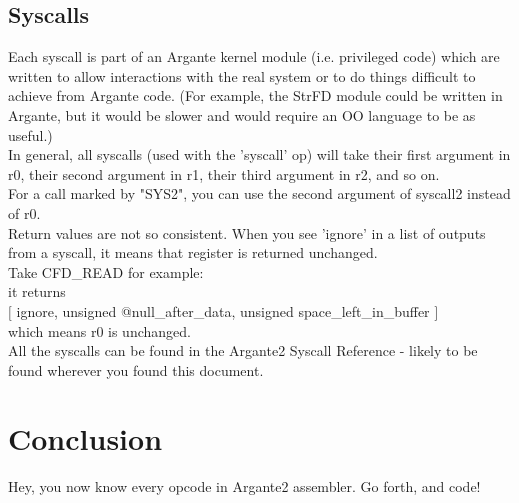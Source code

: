 \documentclass[a4paper,oneside,openany]{book}
\begin{document}
\subsection{Syscalls}
Each syscall is part of an Argante kernel module (i.e. privileged code) which are
written to allow interactions with the real system or to do things difficult to
achieve from Argante code. (For example, the StrFD module could be written in
Argante, but it would be slower and would require an OO language to be as useful.)\\
In general, all syscalls (used with the 'syscall' op) will take their first argument
in r0, their second argument in r1, their third argument in r2, and so on.\\
For a call marked by "SYS2", you can use the second argument of syscall2 instead of
r0.\\
Return values are not so consistent. When you see 'ignore' in a list of outputs from
a syscall, it means that register is returned unchanged.\\
Take CFD\_READ for example:\\
it returns\\
$[$ ignore, unsigned @null\_after\_data, unsigned space\_left\_in\_buffer $]$
\\
which means r0 is unchanged.\smallskip\\
All the syscalls can be found in the Argante2 Syscall Reference - likely to
be found wherever you found this document.
\section{Conclusion}
Hey, you now know every opcode in Argante2 assembler. Go forth, and code!
\end{document}
